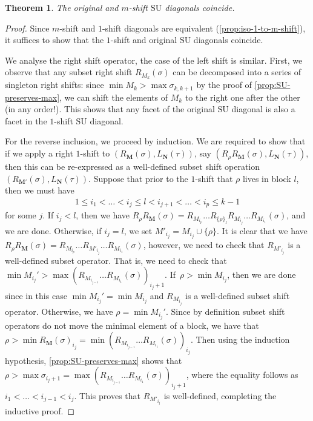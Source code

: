 \documentclass{amsart}
\newcommand{\Guillaume}[1]{\todo[color=magenta!30]{\rm #1 \\ \hfill --- G.}}
\newtheorem{theorem}{Theorem}[section]
\theoremstyle{definition}
\newcommand{\SU}{\mathrm{SU}}
\begin{document}
\begin{theorem}
\label{prop:iso-original-shift-diagonals}
The original and $m$-shift $\SU$ diagonals coincide.
\end{theorem}

\Guillaume{review terminology in the proof}

\begin{proof}
Since $m$-shift and $1$-shift diagonals are equivalent (\cref{prop:iso-1-to-m-shift}), it suffices to show that the $1$-shift and original $\SU$ diagonals coincide. 

We analyse the right shift operator, the case of the left shift is similar. 
First, we observe that any subset right shift $R_{M_k}(\sigma)$ can be decomposed into a series of singleton right shifts: since $\min M_k > \max \sigma_{k,k+1}$ by the proof of \cref{prop:SU-preserves-max}, we can shift the elements of $M_k$ to the right one after the other (in any order!).
This shows that any facet of the original $\SU$ diagonal is also a facet in the $1$-shift $\SU$ diagonal.

For the reverse inclusion, we proceed by induction. 
We are required to show that if we apply a right $1$-shift to $(R_{\mathbf{M}}(\sigma),L_{\mathbf{N}}(\tau))$, say $(R_{\rho}R_{\mathbf{M}}(\sigma),L_{\mathbf{N}}(\tau))$, then this can be re-expressed as a well-defined subset shift operation $(R_{\mathbf{M'}}(\sigma),L_{\mathbf{N}}(\tau))$. Suppose that prior to the $1$-shift that $\rho$ lives in block $l$, then we must have
\begin{align*}
    1 \leq i_1 < \dots < i_j \leq l < i_{j+1} <\dots< i_p \leq k-1
\end{align*}
for some $j$. 
If $i_j < l$, then we have $R_{\rho}R_{\mathbf{M}}(\sigma) = R_{M_{i_p}}\dots R_{\{\rho\}_{l}}R_{M_{i_j}}\dots R_{M_{i_1}}(\sigma)$, and we are done.
Otherwise, if $i_j = l$, we set $M'_{i_j} = M_{i_j} \cup \{\rho \}$. 
It is clear that we have $R_{\rho}R_{\mathbf{M}}(\sigma) = R_{M_{i_p}}\dots R_{M'_{i_j}}\dots R_{M_{i_1}}(\sigma)$, however, we need to check that $R_{M'_{i_j}}$ is a well-defined subset operator. 
That is, we need to check that $\min M_{i_j}' > \max (R_{M_{i_{j-1}}}\dots R_{M_{i_1}}(\sigma))_{i_j+1}$.
If~$\rho > \min M_{i_j}$, then we are done since in this case $\min M_{i_j}'=\min M_{i_j}$ and $R_{M_{i_j}}$ is a well-defined subset shift operator.
Otherwise, we have $\rho=\min M_{i_j}'$. 
Since by definition subset shift operators do not move the minimal element of a block, we have that $\rho > \min R_{\mathbf{M}}(\sigma)_{i_j}= \min (R_{M_{i_{j-1}}}\dots R_{M_{i_1}}(\sigma))_{i_j}$.
Then using the induction hypothesis, \cref{prop:SU-preserves-max} shows that $\rho>\max \sigma_{i_j+1} = \max (R_{M_{i_{j-1}}}\dots R_{M_{i_1}}(\sigma))_{i_j + 1}$, where the equality follows as $i_1<\dots<i_{j-1}<i_j$. 
This proves that $R_{M'_{i_j}}$ is well-defined, completing the inductive proof.
\end{proof}
\end{document}
